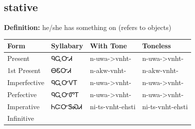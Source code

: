 \documentclass{article}%
\begin{document}
\subsection*{stative}%
\textbf{Definition: }%
he/she has something on (refers to objects)%
\\[0.5em]%
\begin{tabular}{|l|l|l|l|}%
\hline%
\textbf{Form}&\textbf{Syllabary}&\textbf{With Tone}&\textbf{Toneless}\\%
\hline%
Present&ᏄᏩᏅᏗ&n{-}uwa{-}>vnht{-}&n{-}uwa{-}>vnht{-}\\%
1st Present&ᎾᏋᏅᏗ&n{-}akw{-}vnht{-}&n{-}akw{-}vnht{-}\\%
Imperfective&ᏄᏩᏅᏙᎢ&n{-}uwa{-}>vnht{-}&n{-}uwa{-}>vnht{-}\\%
Perfective&ᏄᏩᏅᏛᎢ&n{-}uwa{-}>vnht{-}&n{-}uwa{-}>vnht{-}\\%
Imperative&ᏂᏨᏅᏕᏍᏗ&ni{-}ts{-}vnht{-}ehsti&ni{-}ts{-}vnht{-}ehsti\\%
Infinitive&&&\\%
\hline%
\end{tabular}%
\\[1em]%
\end{document}
